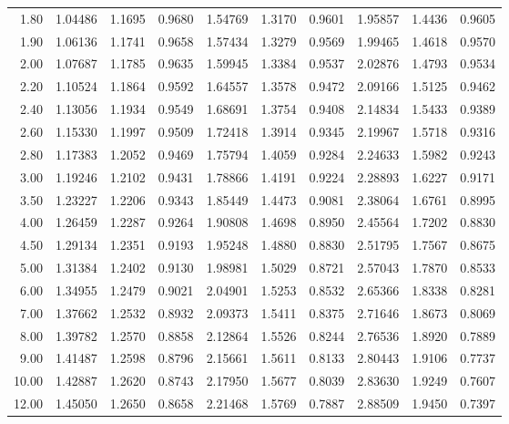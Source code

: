 {\begin{longtable}{|||d{3.2}|X|X|X|||}
1.80   & 1.04486  & 1.1695  & 0.9680  & 1.54769   & 1.3170  & 0.9601  & 1.95857  & 1.4436  & 0.9605 \\*  
1.90   & 1.06136  & 1.1741  & 0.9658  & 1.57434   & 1.3279  & 0.9569  & 1.99465  & 1.4618  & 0.9570 \\[6pt]  
%
2.00   & 1.07687  & 1.1785  & 0.9635  & 1.59945   & 1.3384  & 0.9537  & 2.02876  & 1.4793  & 0.9534 \\*  
2.20   & 1.10524  & 1.1864  & 0.9592  & 1.64557   & 1.3578  & 0.9472  & 2.09166  & 1.5125  & 0.9462 \\  
2.40   & 1.13056  & 1.1934  & 0.9549  & 1.68691   & 1.3754  & 0.9408  & 2.14834  & 1.5433  & 0.9389 \\  
2.60   & 1.15330  & 1.1997  & 0.9509  & 1.72418   & 1.3914  & 0.9345  & 2.19967  & 1.5718  & 0.9316 \\  
2.80   & 1.17383  & 1.2052  & 0.9469  & 1.75794   & 1.4059  & 0.9284  & 2.24633  & 1.5982  & 0.9243 \\ 
3.00   & 1.19246  & 1.2102  & 0.9431  & 1.78866   & 1.4191  & 0.9224  & 2.28893  & 1.6227  & 0.9171 \\     
3.50   & 1.23227  & 1.2206  & 0.9343  & 1.85449   & 1.4473  & 0.9081  & 2.38064  & 1.6761  & 0.8995 \\     
4.00   & 1.26459  & 1.2287  & 0.9264  & 1.90808   & 1.4698  & 0.8950  & 2.45564  & 1.7202  & 0.8830 \\*   
4.50   & 1.29134  & 1.2351  & 0.9193  & 1.95248   & 1.4880  & 0.8830  & 2.51795  & 1.7567  & 0.8675 \\*    
5.00   & 1.31384  & 1.2402  & 0.9130  & 1.98981   & 1.5029  & 0.8721  & 2.57043  & 1.7870  & 0.8533 \\[6pt]    
%
6.00   & 1.34955  & 1.2479  & 0.9021  & 2.04901   & 1.5253  & 0.8532  & 2.65366  & 1.8338  & 0.8281 \\*     
7.00   & 1.37662  & 1.2532  & 0.8932  & 2.09373   & 1.5411  & 0.8375  & 2.71646  & 1.8673  & 0.8069 \\    
8.00   & 1.39782  & 1.2570  & 0.8858  & 2.12864   & 1.5526  & 0.8244  & 2.76536  & 1.8920  & 0.7889 \\     
9.00   & 1.41487  & 1.2598  & 0.8796  & 2.15661   & 1.5611  & 0.8133  & 2.80443  & 1.9106  & 0.7737 \\     
10.00  & 1.42887  & 1.2620  & 0.8743  & 2.17950   & 1.5677  & 0.8039  & 2.83630  & 1.9249  & 0.7607 \\     
12.00  & 1.45050  & 1.2650  & 0.8658  & 2.21468   & 1.5769  & 0.7887  & 2.88509  & 1.9450  & 0.7397 \\     

\end{longtable}}
